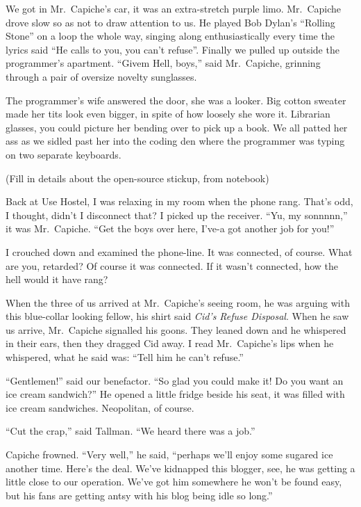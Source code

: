 \documentclass[oneside]{book}
\begin{document}
We got in Mr.~Capiche's car, it was an extra-stretch purple limo.  Mr.~Capiche drove
slow so as not to draw attention to us.
He played Bob Dylan's ``Rolling Stone'' on a loop the whole way, singing along
enthusiastically every time the lyrics said ``He calls to you, you can't refuse''.
Finally we pulled up outside the
programmer's apartment.  ``Givem Hell, boys,'' said Mr.~Capiche, grinning through a
pair of oversize novelty sunglasses.

The programmer's wife answered the door, she was a looker.  Big cotton sweater
made her tits look even bigger, in spite of how loosely she wore it.
Librarian glasses, you could picture her bending over to pick up a book.
We all patted her ass as we sidled past her into the coding den where the
programmer was typing on two separate keyboards.


(Fill in details about the open-source stickup, from notebook)

Back at Use Hostel, I was relaxing in my room when the phone rang.
That's odd, I thought, didn't I disconnect that?  I picked up the receiver.
``Yu, my sonnnnn,'' it was Mr.~Capiche.  ``Get the boys over here, I've-a
got another job for you!''

I crouched down and examined the phone-line.  It was connected, of course.
What are you, retarded?  Of course it was connected.  If it wasn't connected,
how the hell would it have rang?

When the three of us arrived at Mr.~Capiche's seeing room, he was arguing
with this blue-collar looking fellow, his shirt said \emph{Cid's Refuse Disposal}.
When he saw us arrive, Mr.~Capiche signalled his goons.  They leaned down and
he whispered in their ears, then they dragged Cid away.  I read Mr.~Capiche's lips
when he whispered, what he said was:  ``Tell him he can't refuse.''

``Gentlemen!'' said our benefactor.  ``So glad you could make it!  Do you want an
ice cream sandwich?''  He opened a little fridge beside his seat, it was filled with
ice cream sandwiches.  Neopolitan, of course.

``Cut the crap,'' said Tallman.  ``We heard there was a job.''

Capiche frowned.  ``Very well,'' he said, ``perhaps we'll enjoy some sugared ice
another time.  Here's the deal.  We've kidnapped this blogger, see, he was getting a
little close to our operation.  We've got him somewhere he won't be found easy, but
his fans are getting antsy with his blog being idle so long.''
\end{document}
